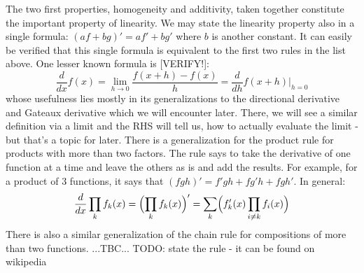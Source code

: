 The two first properties, homogeneity and additivity, taken together constitute the important property of linearity. We may state the linearity property also in a single formula: $(a f + b g)' = a f' + b g'$ where $b$ is another constant. It can easily be verified that this single formula is equivalent to the first two rules in the list above. One lesser known formula is [VERIFY!]:
\begin{equation}
\label{Eq:DerivativeViaH}
 \frac{d}{d x} f(x) 
 = \lim_{h \rightarrow 0} \frac{f(x + h) - f(x)}{h}
 = \frac{d}{d h} f(x + h) \bigg\rvert_{h=0}
\end{equation}
whose usefulness lies mostly in its generalizations to the directional derivative and Gateaux derivative which we will encounter later. There, we will see a similar definition via a limit and the RHS will tell us, how to actually evaluate the limit - but that's a topic for later. There is a generalization for the product rule for products with more than two factors. The rule says to 
take the derivative of one function at a time and leave the others as is and add the results. For example, for a product of 3 functions, it says that $(fgh)' =  f' g h + f g' h + f g h'$.  In general:
\begin{equation}
\frac{d}{dx} \prod_k f_k(x)  
= \Bigl(  \prod_k f_k(x)   \Bigr) '
= \sum_k \Bigl( f_k'(x) \prod_{i \neq k} f_i(x)  \Bigr) 
\end{equation}
There is also a similar generalization of the chain rule for compositions of more than two functions. ...TBC... TODO: state the rule - it can be found on wikipedia %




